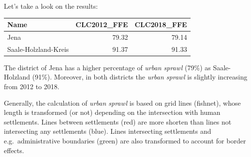 \documentclass[]{article}
\newenvironment{Shaded}{\begin{snugshade}}{\end{snugshade}}
\newcommand{\KeywordTok}[1]{\textcolor[rgb]{0.13,0.29,0.53}{\textbf{#1}}}
\newcommand{\DataTypeTok}[1]{\textcolor[rgb]{0.13,0.29,0.53}{#1}}
\newcommand{\DecValTok}[1]{\textcolor[rgb]{0.00,0.00,0.81}{#1}}
\newcommand{\StringTok}[1]{\textcolor[rgb]{0.31,0.60,0.02}{#1}}
\newcommand{\CommentTok}[1]{\textcolor[rgb]{0.56,0.35,0.01}{\textit{#1}}}
\newcommand{\OtherTok}[1]{\textcolor[rgb]{0.56,0.35,0.01}{#1}}
\newcommand{\OperatorTok}[1]{\textcolor[rgb]{0.81,0.36,0.00}{\textbf{#1}}}
\newcommand{\NormalTok}[1]{#1}
\begin{document}
\begin{Shaded}
\end{Shaded}

Let's take a look on the results:

\begin{longtable}[]{@{}lrr@{}}
\toprule
Name & CLC2012\_FFE & CLC2018\_FFE\tabularnewline
\midrule
\endhead
Jena & 79.32 & 79.14\tabularnewline
Saale-Holzland-Kreis & 91.37 & 91.33\tabularnewline
\bottomrule
\end{longtable}

The district of Jena has a higher percentage of \emph{urban sprawl}
(79\%) as Saale-Holzland (91\%). Moreover, in both districts the
\emph{urban sprawl} is slightly increasing from 2012 to 2018.

Generally, the calculation of \emph{urban sprawl} is based on grid lines
(fishnet), whose length is transformed (or not) depending on the
intersection with human settlements. Lines between settlements (red) are
more shorten than lines not intersecting any settlements (blue). Lines
intersecting settlements and e.g.~administrative boundaries (green) are
also transformed to account for border effects.
\end{document}
